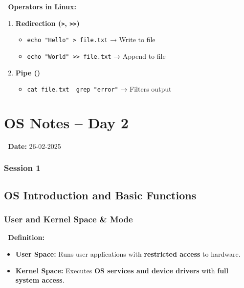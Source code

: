 \documentclass[
]{article}
\providecommand{\tightlist}{%
  \setlength{\itemsep}{0pt}\setlength{\parskip}{0pt}}
\begin{document}
📌 \textbf{Operators in Linux:}

\begin{enumerate}
\def\labelenumi{\arabic{enumi}.}
\item
  \textbf{Redirection (\texttt{\textgreater{}},
  \texttt{\textgreater{}\textgreater{}})}

  \begin{itemize}
  \tightlist
  \item
    \texttt{echo\ "Hello"\ \textgreater{}\ file.txt} → Write to file
  \item
    \texttt{echo\ "World"\ \textgreater{}\textgreater{}\ file.txt} →
    Append to file
  \end{itemize}
\item
  \textbf{Pipe (\texttt{\textbar{}})}

  \begin{itemize}
  \tightlist
  \item
    \texttt{cat\ file.txt\ \textbar{}\ grep\ "error"} → Filters output
  \end{itemize}
\end{enumerate}

\section{\texorpdfstring{\textbf{OS Notes -- Day
2}}{OS Notes -- Day 2}}\label{os-notes-day-2}

📅 \textbf{Date:} 26-02-2025

\subsubsection{Session 1}\label{session-1}

\subsection{\texorpdfstring{\textbf{OS Introduction and Basic
Functions}}{OS Introduction and Basic Functions}}\label{os-introduction-and-basic-functions}

\subsubsection{\texorpdfstring{\textbf{User and Kernel Space \&
Mode}}{User and Kernel Space \& Mode}}\label{user-and-kernel-space-mode}

📌 \textbf{Definition:}

\begin{itemize}
\tightlist
\item
  \textbf{User Space:} Runs user applications with \textbf{restricted
  access} to hardware.
\item
  \textbf{Kernel Space:} Executes \textbf{OS services and device
  drivers} with \textbf{full system access}.
\end{itemize}
\end{document}

